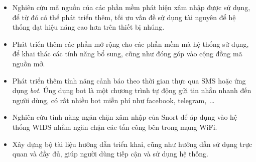\begin{itemize}
\item Nghiên cứu mã nguồn của các phần mềm phát hiện xâm nhập được sử dụng, để từ đó có thể phát triển thêm, tối ưu vấn đề sử dụng tài nguyên để hệ thống đạt hiệu năng cao hơn trên thiết bị nhúng.
\item Phát triển thêm các phần mở rộng cho các phần mềm mà hệ thống sử dụng, để khai thác các tính năng bổ sung, cũng như đóng góp vào cộng đồng mã nguồn mở.
\item Phát triển thêm tính năng cảnh báo theo thời gian thực qua SMS hoặc ứng dụng \emph{bot}. Ứng dụng bot là một chương trình tự động gửi tin nhắn nhanh đến người dùng, có rất nhiều bot miễn phí như facebook, telegram,~\ldots
\item Nghiên cứu tính năng ngăn chặn xâm nhập của Snort để áp dụng vào hệ thống WIDS nhằm ngăn chặn các tấn công bên trong mạng WiFi.
\item Xây dựng bộ tài liệu hướng dẫn triển khai, cũng như hướng dẫn sử dụng trực quan và đầy đủ, giúp người dùng tiếp cận và sử dụng hệ thống.
\end{itemize}





